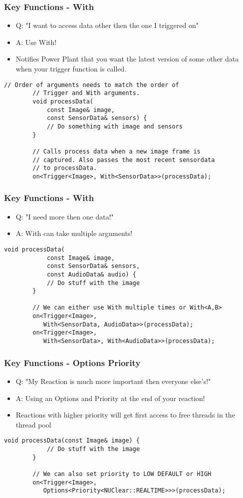 \documentclass{beamer}
\begin{document}
\begin{frame}[fragile]
	\frametitle {Key Functions - With}
	\begin{itemize}
		\item Q: "I want to access data other then the one I triggered on"
		\item A: Use With!
		\item Notifies Power Plant that you want the latest version of some other data when your trigger function is called.
	\end{itemize}

	\begin{lstlisting}[language=nuclear]
		// Order of arguments needs to match the order of
		// Trigger and With arguments.
		void processData(
		    const Image& image,
		    const SensorData& sensors) {
		    // Do something with image and sensors
		}

		// Calls process data when a new image frame is
		// captured. Also passes the most recent sensordata
		// to processData.
		on<Trigger<Image>, With<SensorData>>(processData);
	\end{lstlisting}
\end{frame}

\begin{frame}[fragile]
	\frametitle {Key Functions - With}
	\begin{itemize}
		\item Q: "I need more then one data!"
		\item A: With can take multiple arguments!
	\end{itemize}

	\begin{lstlisting}[language=nuclear]
		void processData(
		    const Image& image,
		    const SensorData& sensors,
		    const AudioData& audio) {
		    // Do stuff with the image
		}

		// We can either use With multiple times or With<A,B>
		on<Trigger<Image>,
		   With<SensorData, AudioData>>(processData);
		on<Trigger<Image>,
		   With<SensorData>, With<AudioData>>(processData);
	\end{lstlisting}
\end{frame}

\begin{frame}[fragile]
	\frametitle {Key Functions - Options Priority}
	\begin{itemize}
		\item Q: "My Reaction is much more important then everyone else's!"
		\item A: Using an Options and Priority at the end of your reaction!
		\item Reactions with higher priority will get first access to free threads in the thread pool
	\end{itemize}

	\begin{lstlisting}[language=nuclear]
		void processData(const Image& image) {
		    // Do stuff with the image
		}

		// We can also set priority to LOW DEFAULT or HIGH
		on<Trigger<Image>,
		   Options<Priority<NUClear::REALTIME>>>(processData);
	\end{lstlisting}
\end{frame}
\end{document}
